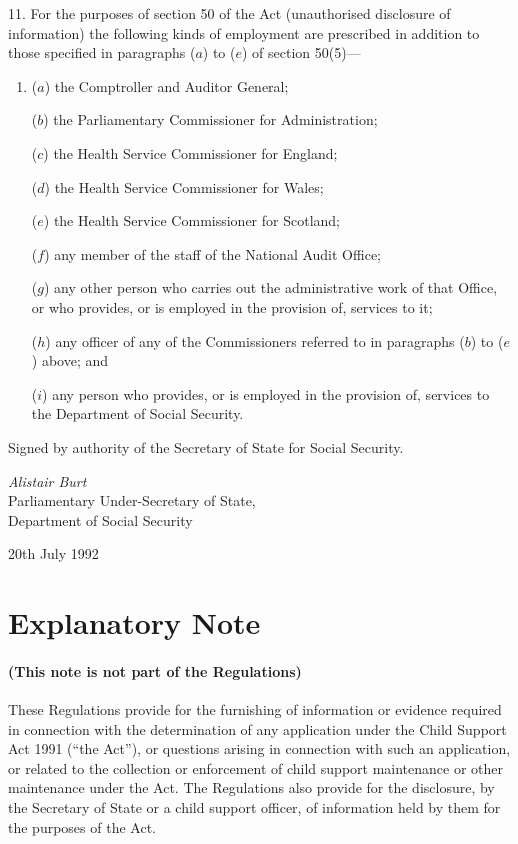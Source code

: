 \documentclass[a4paper,12pt]{article}
\begin{document}
11.  For the purposes of section 50 of the Act (unauthorised disclosure of information) the following kinds of employment are prescribed in addition to those specified in paragraphs ($a$) to ($e$) of section 50(5)—
\begin{enumerate}\item[]
($a$) the Comptroller and Auditor General;

($b$) the Parliamentary Commissioner for Administration;

($c$) the Health Service Commissioner for England;

($d$) the Health Service Commissioner for Wales;

($e$) the Health Service Commissioner for Scotland;

($f$) any member of the staff of the National Audit Office;

($g$) any other person who carries out the administrative work of that Office, or who provides, or is employed in the provision of, services to it;

($h$) any officer of any of the Commissioners referred to in paragraphs ($b$) to ($e$) above; and

($i$) any person who provides, or is employed in the provision of, services to the Department of Social Security.
\end{enumerate}

\bigskip

Signed by authority of the Secretary of State for Social Security.

{\raggedleft
\emph{Alistair Burt}\\Parliamentary Under-Secretary of State,\\Department of Social Security

}

20th July 1992

\small

\part{Explanatory Note}

\renewcommand\parthead{--- Explanatory Note}

\subsection*{(This note is not part of the Regulations)}

 These Regulations provide for the furnishing of information or evidence required in connection with the determination of any application under the Child Support Act 1991 (“the Act”), or questions arising in connection with such an application, or related to the collection or enforcement of child support maintenance or other maintenance under the Act. The Regulations also provide for the disclosure, by the Secretary of State or a child support officer, of information held by them for the purposes of the Act.
\end{document}
